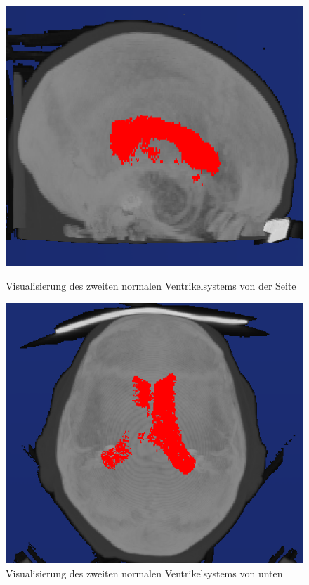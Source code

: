 \begin{figure}[H]
\begin{minipage}[b]{.5\textwidth}
  \centering
  \includegraphics[width=.9\linewidth, height=.9\linewidth]{Logos/Normal2/Seite2.PNG}
  \caption{Visualisierung des zweiten normalen Ventrikelsystems von der Seite}
  \label{fig:norm2_s}
\end{minipage}%
\begin{minipage}[b]{.5\textwidth}
  \centering
  \includegraphics[width=.9\linewidth, height=.9\linewidth]{Logos/Normal2/Unten3.PNG}
  \caption{Visualisierung des zweiten normalen Ventrikelsystems von unten}
  \label{fig:norm2_u}
\end{minipage}
\end{figure}

